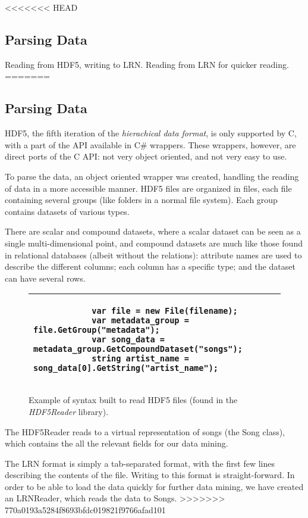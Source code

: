 <<<<<<< HEAD
\subsection{Parsing Data}
\label{sec:preprocessing_parsing}

Reading from HDF5, writing to LRN. Reading from LRN for quicker reading.
=======
\subsection{Parsing Data}
\label{sec:preprocessing_parsing}

HDF5, the fifth iteration of the \emph{hierachical data format}, is only supported by C, with a part of the API available
in C\# wrappers. These wrappers, however, are direct ports of the C API: not very object oriented, and not very easy to use.

To parse the data, an object oriented wrapper was created, handling the reading of data in a more accessible manner. HDF5 files
are organized in files, each file containing several groups (like folders in a normal file system). Each group contains
datasets of various types.

There are scalar and compound datasets, where a scalar dataset can be seen as a single multi-dimensional point, and compound
datasets are much like those found in relational databases (albeit without the relations): attribute names are used to describe
the different columns; each column has a specific type; and the dataset can have several rows.

\begin{figure}[h!]
	\begin{tabular}{|p{\textwidth}|}
		\hline
		\begin{verbatim}
			var file = new File(filename);
			var metadata_group = file.GetGroup("metadata");
			var song_data = metadata_group.GetCompoundDataset("songs");
			string artist_name = song_data[0].GetString("artist_name");
		\end{verbatim} \\
		\hline
	\end{tabular}
	\caption{Example of syntax built to read HDF5 files (found in the \emph{HDF5Reader} library).}
\end{figure}

The HDF5Reader reads to a virtual representation of songs (the Song class), which contains the all the relevant fields for our data
mining.

The LRN format is simply a tab-separated format, with the first few lines describing the contents of the file. Writing to this format
is straight-forward. In order to be able to load the data quickly for further data mining, we have created an LRNReader, which reads
the data to Songs.
>>>>>>> 770a0193a5284f8693bfdc019821f9766afad101
